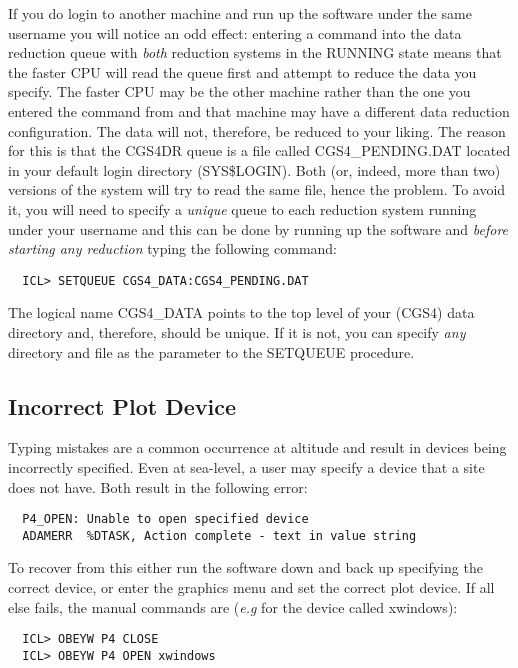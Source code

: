 {If you do login to another machine and run up the software under the same 
username you will notice an odd effect: entering a command into the data 
reduction queue with {\em both} reduction systems in the {\sf RUNNING} state 
means that the faster CPU will read the queue first and attempt to 
reduce the data you specify. The faster CPU may be the other machine rather 
than the one you entered the command from and that machine may have a 
different data reduction configuration. The data will not, therefore, be 
reduced to your liking. The reason for this is that the CGS4DR queue is 
a file called {\sf CGS4\_PENDING.DAT} located in your default login 
directory (SYS\$LOGIN). Both (or, indeed, more than two) versions of the 
system will try to read the same file, hence the problem.
To avoid it, you will need to specify a {\em unique} queue to each 
reduction system running under your username and this can be done by 
running up the software and {\em before starting any reduction} typing 
the following command:

\begin{verbatim}
  ICL> SETQUEUE CGS4_DATA:CGS4_PENDING.DAT
\end{verbatim}

The logical name CGS4\_DATA points to the top level of your (CGS4) data 
directory and, therefore, should be unique. If it is not, you can specify
{\em any} directory and file as the parameter to the {\sf SETQUEUE} procedure. 

\subsection{Incorrect Plot Device}
\label{incorrect_plot_device}

Typing mistakes are a common occurrence at altitude and result in devices
being incorrectly specified. Even at sea-level, a user may specify a 
device that a site does not have. Both result in the following error:

\begin{verbatim}
  P4_OPEN: Unable to open specified device
  ADAMERR  %DTASK, Action complete - text in value string
\end{verbatim}

To recover from this either run the software down and back up specifying
the correct device, or enter the {\sf graphics} menu and set the correct plot
device. If all else fails, the manual commands are ({\em e.g} for the device
called {\sf xwindows}):

\begin{verbatim}
  ICL> OBEYW P4 CLOSE
  ICL> OBEYW P4 OPEN xwindows
\end{verbatim}

}
